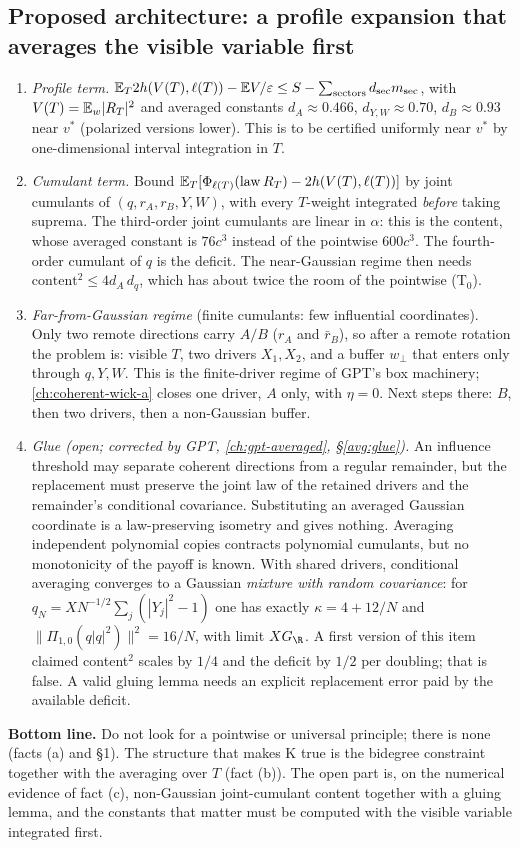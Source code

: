 \subsection{Proposed architecture: a profile expansion that averages the visible variable first}
\begin{enumerate}
\item \emph{Profile term.} $\mathbb E_T2h(V(T),\ell(T))-\mathbb E V/\varepsilon\le S-\sum_{\rm sectors}d_{\rm sec}m_{\rm sec}$, with $V(T)=\mathbb E_w|R_T|^2$ and averaged constants
$d_A\approx0.466$, $d_{Y,W}\approx0.70$, $d_B\approx0.93$ near $v^*$ (polarized versions lower). This is to be certified uniformly near $v^*$ by one-dimensional interval integration
in $T$.
\item \emph{Cumulant term.} Bound $\mathbb E_T[\Phi_{\ell(T)}(\mathrm{law}\,R_T)-2h(V(T),\ell(T))]$ by joint cumulants of $(q,r_A,r_B,Y,W)$, with every $T$-weight integrated \emph{before}
taking suprema. The third-order joint cumulants are linear in $\alpha$: this is the content, whose averaged constant is $76c^3$ instead of the pointwise $600c^3$. The fourth-order cumulant of
$q$ is the deficit. The near-Gaussian regime then needs $\text{content}^2\le4d_A\,d_q$, which has about twice the room of the pointwise (T$_0$).
\item \emph{Far-from-Gaussian regime} (finite cumulants: few influential coordinates). Only two remote directions carry $A/B$ ($r_A$ and $\bar r_B$), so after a remote rotation the problem
is: visible $T$, two drivers $X_1,X_2$, and a buffer $w_\perp$ that enters only through $q,Y,W$. This is the finite-driver regime of GPT's box machinery; \autoref{ch:coherent-wick-a}
closes one driver, $A$ only, with $\eta=0$. Next steps there: $B$, then two drivers, then a non-Gaussian buffer.
\item \emph{Glue (open; corrected by GPT, \autoref{ch:gpt-averaged}, \S\ref{avg:glue}).} An influence threshold may separate coherent directions from a regular remainder, but the
replacement must preserve the joint law of the retained drivers and the remainder's conditional covariance. Substituting an averaged Gaussian coordinate is a law-preserving isometry and gives
nothing. Averaging independent polynomial copies contracts polynomial cumulants, but no monotonicity of the payoff is known. With shared drivers, conditional averaging converges to a Gaussian
\emph{mixture with random covariance}: for $q_N=XN^{-1/2}\sum_j(|Y_j|^2-1)$ one has exactly $\kappa=4+12/N$ and $\|\Pi_{1,0}(q|q|^2)\|^2=16/N$, with limit $XG_{\R}$. A first version of
this item claimed content$^2$ scales by $1/4$ and the deficit by $1/2$ per doubling; that is false. A valid gluing lemma needs an explicit replacement error paid by the available deficit.
\end{enumerate}
\textbf{Bottom line.} Do not look for a pointwise or universal principle; there is none (facts (a) and \S1). The structure that makes K true is the bidegree constraint together with the
averaging over $T$ (fact (b)). The open part is, on the numerical evidence of fact (c), non-Gaussian joint-cumulant content together with a gluing lemma, and the constants that matter must be computed with the visible variable integrated
first.
